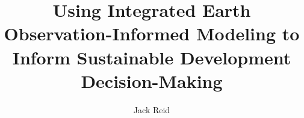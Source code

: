 % 
% 
%
%
%
%
%
%
%
%
% 
% 

\title{Using Integrated Earth Observation-Informed Modeling to Inform Sustainable Development Decision-Making}

\author{Jack Reid}


